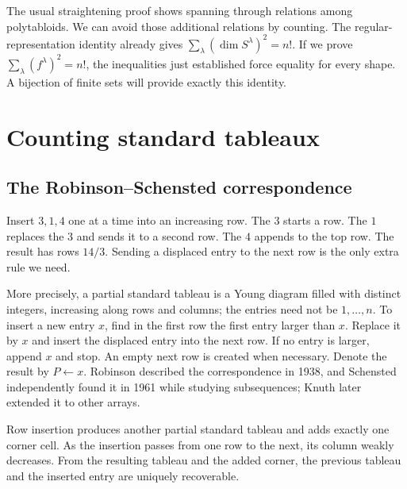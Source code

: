 The usual straightening proof shows spanning through relations among polytabloids. We can avoid those additional relations by counting. The regular-representation identity already gives
$\sum_\lambda(\dim S^\lambda)^2=n!$.
If we prove $\sum_\lambda(f^\lambda)^2=n!$, the inequalities just established force equality for every shape. A bijection of finite sets will provide exactly this identity.

\section{Counting standard tableaux}

\subsection*{The Robinson--Schensted correspondence}

Insert $3,1,4$ one at a time into an increasing row. The $3$ starts a row. The $1$ replaces the $3$ and sends it to a second row. The $4$ appends to the top row. The result has rows $14/3$. Sending a displaced entry to the next row is the only extra rule we need.

More precisely, a partial standard tableau is a Young diagram filled with distinct integers, increasing along rows and columns; the entries need not be $1,\ldots,n$. To insert a new entry $x$, find in the first row the first entry larger than $x$. Replace it by $x$ and insert the displaced entry into the next row. If no entry is larger, append $x$ and stop. An empty next row is created when necessary. Denote the result by $P\leftarrow x$. Robinson described the correspondence in 1938, and Schensted independently found it in 1961 while studying subsequences; Knuth later extended it to other arrays.

\begin{lemma}\label{lem:insertion}
Row insertion produces another partial standard tableau and adds exactly one corner cell. As the insertion passes from one row to the next, its column weakly decreases. From the resulting tableau and the added corner, the previous tableau and the inserted entry are uniquely recoverable.
\end{lemma}

